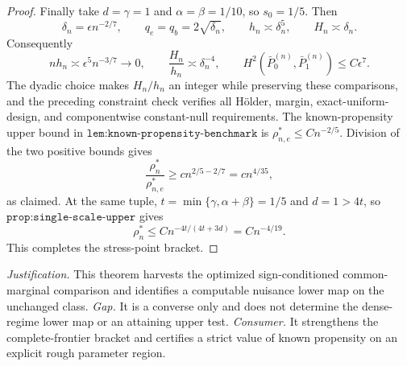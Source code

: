 \documentclass{article}
\begin{document}
\begin{proof}
Finally take \(d=\gamma=1\) and \(\alpha=\beta=1/10\), so \(s_0=1/5\).  Then
\[
 \delta_n=\epsilon n^{-2/7},
 \qquad
 q_e=q_b=2\sqrt{\delta_n},
 \qquad
 h_n\asymp\delta_n^5,
 \qquad
 H_n\asymp\delta_n.
\]
Consequently
\[
 nh_n\asymp\epsilon^5n^{-3/7}\longrightarrow0,
 \qquad
 \frac{H_n}{h_n}\asymp\delta_n^{-4},
 \qquad
 H^2(\bar P_0^{(n)},\bar P_1^{(n)})\leq C\epsilon^7.
\]
The dyadic choice makes \(H_n/h_n\) an integer while preserving these comparisons, and the preceding constraint check verifies all Hölder, margin, exact-uniform-design, and componentwise constant-null requirements.  The known-propensity upper bound in \(\texttt{lem:known-propensity-benchmark}\) is \(\rho_{n,e}^*\leq Cn^{-2/5}\).  Division of the two positive bounds gives
\[
 \frac{\rho_n^*}{\rho_{n,e}^*}
 \geq c n^{2/5-2/7}=c n^{4/35},
\]
as claimed.  At the same tuple, \(t=\min\{\gamma,\alpha+\beta\}=1/5\) and \(d=1>4t\), so \(\texttt{prop:single-scale-upper}\) gives
\[
 \rho_n^*\leq Cn^{-4t/(4t+3d)}=Cn^{-4/19}.
\]
This completes the stress-point bracket.
\end{proof}
\par\smallskip\noindent \textit{Justification.} This theorem harvests the optimized sign-conditioned common-marginal comparison and identifies a computable nuisance lower map on the unchanged class. \textit{Gap.} It is a converse only and does not determine the dense-regime lower map or an attaining upper test. \textit{Consumer.} It strengthens the complete-frontier bracket and certifies a strict value of known propensity on an explicit rough parameter region.
\end{document}
